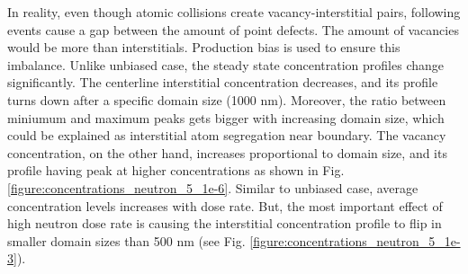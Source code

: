 \documentclass[a4paper]{article}
\begin{document}
      \hspace{10pt}
      In reality, even though atomic collisions create vacancy-interstitial pairs, following events cause a gap between the amount of point defects. The amount of vacancies would be more than interstitials. Production bias is used to ensure this imbalance. Unlike unbiased case, the steady state concentration profiles change significantly. The centerline interstitial concentration decreases, and its profile turns down after a specific domain size (1000 nm). Moreover, the ratio between miniumum and maximum peaks gets bigger with increasing domain size, which could be explained as interstitial atom segregation near boundary. The vacancy concentration, on the other hand, increases proportional to domain size, and its profile having peak at higher concentrations as shown in Fig. \ref{figure:concentrations_neutron_5_1e-6}. Similar to unbiased case, average concentration levels increases with dose rate. But, the most important effect of high neutron dose rate is causing the interstitial concentration profile to flip in smaller domain sizes than 500 nm (see Fig. \ref{figure:concentrations_neutron_5_1e-3}).
\end{document}
